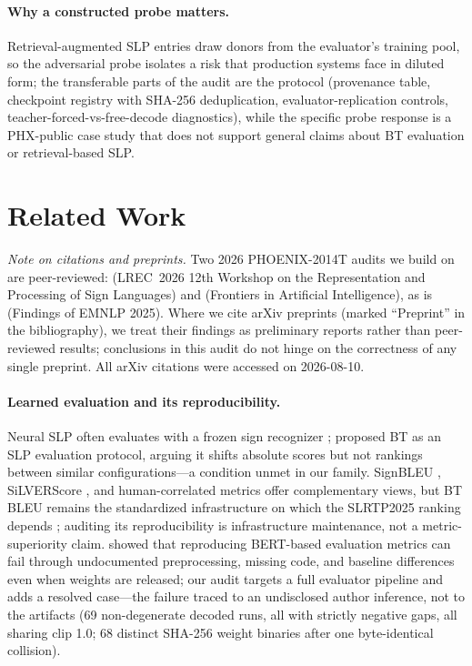 \documentclass[pdflatex,sn-chicago]{sn-jnl}
\begin{document}
\paragraph{Why a constructed probe matters.}
Retrieval-augmented SLP entries draw donors from the evaluator's training pool, so the adversarial probe isolates a risk that production systems face in diluted form; the transferable parts of the audit are the protocol (provenance table, checkpoint registry with SHA-256 deduplication, evaluator-replication controls, teacher-forced-vs-free-decode diagnostics), while the specific probe response is a PHX-public case study that does not support general claims about BT evaluation or retrieval-based SLP.

\section{Related Work}

\noindent\textit{Note on citations and preprints.} Two 2026 PHOENIX-2014T audits we build on are peer-reviewed: \citet{czehmann2026sacred} (LREC~2026 12th Workshop on the Representation and Processing of Sign Languages) and \citet{alkain2026critical} (Frontiers in Artificial Intelligence), as is \citet{artiaga2025signer} (Findings of EMNLP 2025). Where we cite arXiv preprints \cite{hong2026conditional,backtranslation2,desai2024systemic} (marked ``Preprint'' in the bibliography), we treat their findings as preliminary reports rather than peer-reviewed results; conclusions in this audit do not hinge on the correctness of any single preprint. All arXiv citations were accessed on 2026-08-10.

\paragraph{Learned evaluation and its reproducibility.}
Neural SLP often evaluates with a frozen sign recognizer \cite{camgoz2018neural,saunders2020progressive}; \citet{saunders2021continuous} proposed BT as an SLP evaluation protocol, arguing it shifts absolute scores but not rankings between similar configurations---a condition unmet in our family. SignBLEU \cite{signbleu}, SiLVERScore \cite{silverscore}, and human-correlated metrics \cite{jiang2025meaningful,backtranslation2} offer complementary views, but BT BLEU remains the standardized infrastructure on which the SLRTP2025 ranking depends \cite{slrtp2025}; auditing its reproducibility is infrastructure maintenance, not a metric-superiority claim. \citet{chen2022repro} showed that reproducing BERT-based evaluation metrics can fail through undocumented preprocessing, missing code, and baseline differences even when weights are released; our audit targets a full evaluator pipeline and adds a resolved case---the failure traced to an undisclosed author inference, not to the artifacts (69 non-degenerate decoded runs, all with strictly negative gaps, all sharing clip 1.0; 68 distinct SHA-256 weight binaries after one byte-identical collision).
\end{document}
